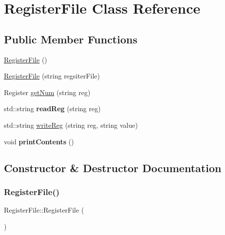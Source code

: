 \hypertarget{class_register_file}{}\section{Register\+File Class Reference}
\label{class_register_file}
\subsection*{Public Member Functions}
\begin{DoxyCompactItemize}
\item 
\mbox{\hyperlink{class_register_file_a9513989ee395d14943de66f99ec8014a}{Register\+File}} ()
\item 
\mbox{\hyperlink{class_register_file_a2bfb1f40fe927673de169aae60ada489}{Register\+File}} (string regsiter\+File)
\item 
Register \mbox{\hyperlink{class_register_file_a54d87ad82368cfa1dfb8b3f01a3d2e5a}{get\+Num}} (string reg)
\item 
\mbox{\label{class_register_file_a5554dd7d1b78c4a59b23036e9aa66136}} 
std\+::string {\bfseries read\+Reg} (string reg)
\item 
std\+::string \mbox{\hyperlink{class_register_file_a4e4802bee78d7c7173c829764babca9c}{write\+Reg}} (string reg, string value)
\item 
\mbox{\label{class_register_file_ac72ef70e7bdee7b5ac7afbfdcd6d8ab1}} 
void {\bfseries print\+Contents} ()
\end{DoxyCompactItemize}


\subsection{Constructor \& Destructor Documentation}
\mbox{\label{class_register_file_a9513989ee395d14943de66f99ec8014a}} 
\subsubsection{\texorpdfstring{Register\+File()}{RegisterFile()}\hspace{0.1cm}{\footnotesize\ttfamily [1/2]}}
{\footnotesize\ttfamily Register\+File\+::\+Register\+File (\begin{DoxyParamCaption}{ }\end{DoxyParamCaption})}

